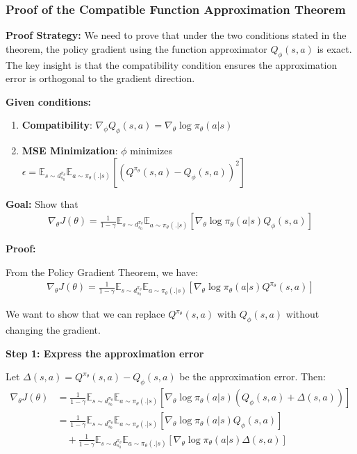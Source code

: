 \subsubsection{Proof of the Compatible Function Approximation Theorem}

\textbf{Proof Strategy:}
We need to prove that under the two conditions stated in the theorem, the policy gradient using the function approximator $Q_\phi(s,a)$ is exact. The key insight is that the compatibility condition ensures the approximation error is orthogonal to the gradient direction.

\textbf{Given conditions:}
\begin{enumerate}
    \item \textbf{Compatibility}: $\nabla_{\phi} Q_\phi(s, a) = \nabla_\theta \log \pi_\theta (a|s)$ 
    \item \textbf{MSE Minimization}: $\phi$ minimizes $\epsilon = \mathbb{E}_{s \sim d^{\pi_\theta}_{s_0}}\mathbb{E}_{a \sim \pi_\theta(.|s)} [(Q^{\pi_\theta} (s, a) - Q_\phi(s, a))^2]$
\end{enumerate}

\textbf{Goal:} Show that
\begin{align}
\nabla_\theta J(\theta) = \frac{1}{1-\gamma}\mathbb{E}_{s \sim d^{\pi_\theta}_{s_0}}\mathbb{E}_{a \sim \pi_\theta(.|s)} [\nabla_\theta \log \pi_\theta (a|s) Q_\phi (s, a)]
\end{align}

\textbf{Proof:}

From the Policy Gradient Theorem, we have:
\begin{align}
\nabla_\theta J(\theta) = \frac{1}{1-\gamma}\mathbb{E}_{s \sim d^{\pi_\theta}_{s_0}}\mathbb{E}_{a \sim \pi_\theta(.|s)} [\nabla_\theta \log \pi_\theta (a|s) Q^{\pi_\theta} (s, a)]
\end{align}

We want to show that we can replace $Q^{\pi_\theta}(s,a)$ with $Q_\phi(s,a)$ without changing the gradient.

\textbf{Step 1: Express the approximation error}

Let $\Delta(s,a) = Q^{\pi_\theta}(s,a) - Q_\phi(s,a)$ be the approximation error. Then:
\begin{align}
\nabla_\theta J(\theta) &= \frac{1}{1-\gamma}\mathbb{E}_{s \sim d^{\pi_\theta}_{s_0}}\mathbb{E}_{a \sim \pi_\theta(.|s)} [\nabla_\theta \log \pi_\theta (a|s) (Q_\phi(s,a) + \Delta(s,a))] \\
&= \frac{1}{1-\gamma}\mathbb{E}_{s \sim d^{\pi_\theta}_{s_0}}\mathbb{E}_{a \sim \pi_\theta(.|s)} [\nabla_\theta \log \pi_\theta (a|s) Q_\phi(s,a)] \\
&\quad + \frac{1}{1-\gamma}\mathbb{E}_{s \sim d^{\pi_\theta}_{s_0}}\mathbb{E}_{a \sim \pi_\theta(.|s)} [\nabla_\theta \log \pi_\theta (a|s) \Delta(s,a)]
\end{align}

